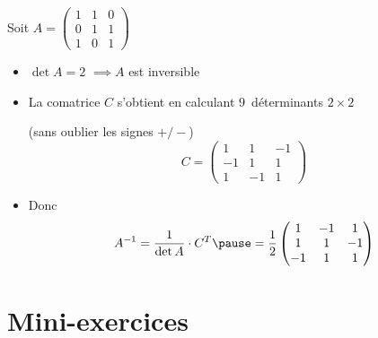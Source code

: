 \begin{frame}

\begin{exemple}
Soit $\displaystyle A = \left(
\begin{array}{ccc}
1 & 1 & 0\\
0 & 1 & 1\\
1 & 0 & 1
\end{array}\right)$

\begin{itemize}
  \item\pause $\det A = 2$ \pause $\implies A $ est inversible 
  \item\pause La comatrice $C$ 
s'obtient en calculant $9$~déterminants
$2\times 2$ 

(sans oublier les signes $+/-$)
\pause
$$C = \begin{pmatrix}
1 & 1 & -1\\
-1 & 1 & 1\\
1 & -1 & 1        
      \end{pmatrix}$$
  \item\pause  Donc 
  $$
A^{-1} = \frac{1}{\det A} \cdot C^T \pause = \frac{1}{2}
\begin{pmatrix}
1 & -1 & 1\\
1 & 1 & -1\\
-1 & 1 & 1  
\end{pmatrix}
$$
\end{itemize}

\end{exemple} 
\end{frame}




\section{Mini-exercices}

